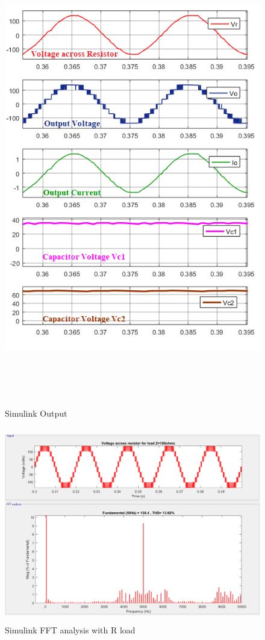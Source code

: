 \documentclass[12pt,a4paper]{report}
\begin{document}
\begin{figure}[H]
	\begin{center}
		\includegraphics[width=15cm,height=20cm]{figures/SIMULINKOUTPUT.png}
	\end{center}
	\caption{Simulink Output}
	\label{sout}	
\end{figure}
\begin{figure}[H]
	\begin{center}
		\includegraphics[width=14cm,height=8.5cm]{figures/FFT_Ronly.png}
	\end{center}
	\caption{Simulink FFT analysis with R load}
	\label{FFT1}
\end{figure}
\end{document}
